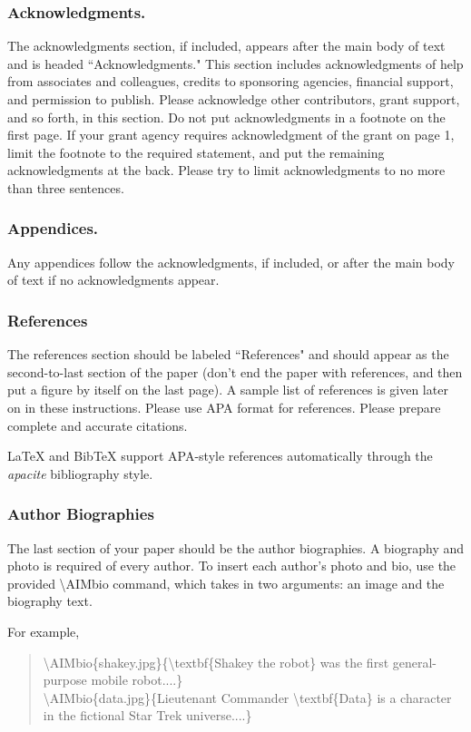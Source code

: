 \documentclass[letterpaper]{article}
\begin{document}
\subsubsection{Acknowledgments.}
The acknowledgments section, if included, appears after the main body of text and is headed ``Acknowledgments." This section includes acknowledgments of help from associates and colleagues, credits to sponsoring agencies, financial support, and permission to publish. Please acknowledge other contributors, grant support, and so forth, in this section. Do not put acknowledgments in a footnote on the first page. If your grant agency requires acknowledgment of the grant on page 1, limit the footnote to the required statement, and put the remaining acknowledgments at the back. Please try to limit acknowledgments to no more than three sentences. 

\subsubsection{Appendices.}
Any appendices follow the acknowledgments, if included, or after the main body of text if no acknowledgments appear. 

\subsubsection{References}
The references section should be labeled ``References" and should appear as the second-to-last section of the paper (don't end the paper with references, and then put a figure by itself on the last page). A sample list of references is given later on in these instructions. Please use APA format for references. Please prepare complete and accurate citations.

\LaTeX{} and BibTeX support APA-style references automatically through the {\em apacite} bibliography style.

\subsubsection{Author Biographies}

The last section of your paper should be the author biographies.  A biography and photo is required of every author.  To insert each author's photo and bio, use the provided \textbackslash AIMbio command, which takes in two arguments:  an image and the biography text.

For example, 
\begin{quote}
\begin{tiny}
\textbackslash AIMbio\{shakey.jpg\}\{\textbackslash textbf\{Shakey the robot\} was the first general-purpose mobile robot....\}\\[3pt]
\textbackslash AIMbio\{data.jpg\}\{Lieutenant Commander \textbackslash textbf\{Data\} is a character in the fictional Star Trek universe....\}
\end{tiny}
\end{quote}
\end{document}
